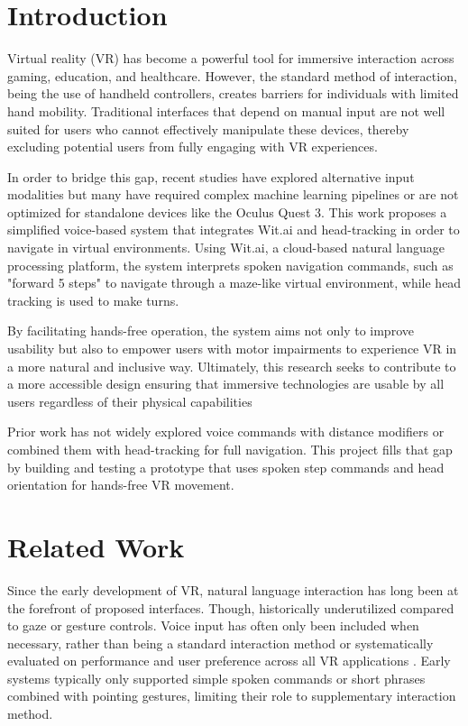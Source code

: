 \documentclass[manuscript, screen, review]{acmart}
\begin{document}
\maketitle

\section{Introduction}
Virtual reality (VR) has become a powerful tool for immersive interaction across gaming, education, and healthcare. However, the standard method of interaction, being the use of handheld controllers, creates barriers for individuals with limited hand mobility. Traditional interfaces that depend on manual input are not well suited for users who cannot effectively manipulate these devices, thereby excluding potential users from fully engaging with VR experiences. 

In order to bridge this gap, recent studies have explored alternative input modalities but many have required complex machine learning pipelines or are not optimized for standalone devices like the Oculus Quest 3. This work proposes a simplified voice-based system that integrates Wit.ai and head-tracking in order to navigate in virtual environments. Using Wit.ai, a cloud-based natural language processing platform, the system interprets spoken navigation commands, such as "forward 5 steps" to navigate through a maze-like virtual environment, while head tracking is used to make turns. 

By facilitating hands-free operation, the system aims not only to improve usability but also to empower users with motor impairments to experience VR in a more natural and inclusive way. Ultimately, this research seeks to contribute to a more accessible design ensuring that immersive technologies are usable by all users regardless of their physical capabilities 

Prior work has not widely explored voice commands with distance modifiers or combined them with head-tracking for full navigation. This project fills that gap by building and testing a prototype that uses spoken step commands and head orientation for hands-free VR movement.

\section{Related Work}
Since the early development of VR, natural language interaction has long been at the forefront of proposed interfaces. Though, historically underutilized compared to gaze or gesture controls. Voice input has often only been included when necessary, rather than being a standard interaction method or systematically evaluated on performance and user preference across all VR applications  \cite{a1}. Early systems typically only supported simple spoken commands or short phrases combined with pointing gestures, limiting their role to supplementary interaction method. 
\end{document}
